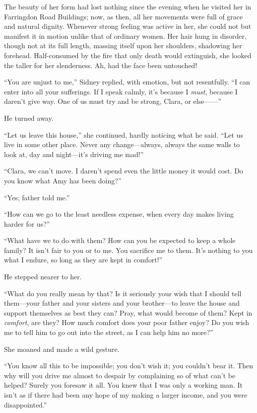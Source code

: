 The beauty of her form had lost nothing since the evening when he
visited her in Farringdon Road Buildings; now, as then, all her
movements were full of grace and natural dignity. Whenever strong
feeling was active in her, she could not but manifest it in motion
unlike that of ordinary women. Her hair hung in disorder, though not at
its full length, massing itself upon her shoulders, shadowing her
forehead. Half-consumed by the fire that only death would extinguish,
she looked the taller for her slenderness. Ah, had the face been
untouched!

``You are unjust to me,'' Sidney replied, with emotion, but not
resentfully. ``I can enter into all your sufferings. If I speak calmly,
it's because I \emph{must}, because I daren't give way. One of us must
try and be strong, Clara, or else{{------}}''

He turned away.

``Let us leave this house,'' she continued, hardly noticing what he
said. ``Let us live in some other place. Never any {}change---always,
always the same walls to look at, day and night---it's driving me mad!''

``Clara, we can't move. I daren't spend even the little money it would
cost. Do you know what Amy has been doing?''

``Yes; father told me.''

``How can we go to the least needless expense, when every day makes
living harder for us?''

``What have we to do with them? How can you be expected to keep a whole
family? It isn't fair to you or to me. You sacrifice me to them. It's
nothing to you what I endure, so long as they are kept in comfort!''

He stepped nearer to her.

``What do you really mean by that? Is it seriously your wish that I
should tell them---your father and your sisters and your brother---to
leave the house and support themselves as best they can? Pray, what
would become of them? Kept in \emph{comfort}, are they? How much comfort
does your poor father enjoy? Do you wish me to tell him to go out into
the street, as I can help him no more?''

She moaned and made a wild gesture.

``You know all this to be impossible; you {}don't wish it; you couldn't
bear it. Then why will you drive me almost to despair by complaining so
of what can't be helped? Surely you foresaw it all. You knew that I was
only a working man. It isn't as if there had been any hope of my making
a larger income, and you were disappointed.''

